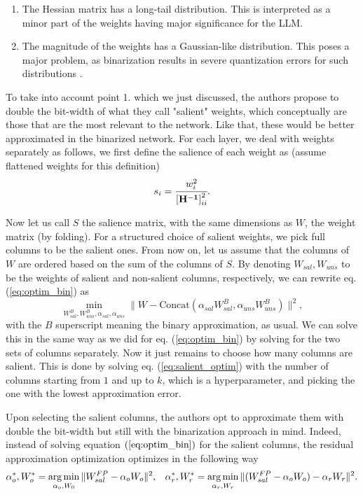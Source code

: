 \begin{enumerate}
    \item The Hessian matrix has a long-tail distribution. This is interpreted as a minor part of the weights having major significance for the LLM.
    \item The magnitude of the weights has a Gaussian-like distribution. This poses a major problem, as binarization results in severe quantization errors for such distributions \cite{jacob2017quantization}.
\end{enumerate}
   
To take into account point 1. which we just discussed, the authors propose to double the bit-width of what they call "salient" weights, which conceptually are those that are the most relevant to the network. Like that, these would be better approximated in the binarized network. For each layer, we deal with weights separately as follows, we first define the salience of each weight as (assume flattened weights for this definition)
\begin{equation}
s_i = \cfrac{w_i^2}{\mathbf{[H^{-1}]}^2_{ii}}.
\end{equation}

Now let us call $S$ the salience matrix, with the same dimensions as $W$, the weight matrix (by folding). For a structured choice of salient weights, we pick full columns to be the salient ones. From now on, let us assume that the columns of $W$ are ordered based on the sum of the columns of $S$. By denoting $W_{sal}, W_{uns}$ to be the weights of salient and non-salient columns, respectively, we can rewrite eq. (\ref{eq:optim_bin}) as
\begin{equation}
\label{eq:salient_optim}
    \min_{W_{sal}^B, W_{uns}^B, \alpha_{sal}, \alpha_{uns}} \|W - \text{Concat}(\alpha_{sal} W_{sal}^B, \alpha_{uns}W_{uns}^B) \|^2,
\end{equation}
with the $B$ superscript meaning the binary approximation, as usual. We can solve this in the same way as we did for eq. (\ref{eq:optim_bin}) by solving for the two sets of columns separately. Now it just remains to choose how many columns are salient. This is done by solving eq. (\ref{eq:salient_optim}) with the number of columns starting from $1$ and up to $k$, which is a hyperparameter, and picking the one with the lowest approximation error.

Upon selecting the salient columns, the authors opt to approximate them with double the bit-width but still with the binarization approach in mind. Indeed, instead of solving equation $(\ref{eq:optim_bin})$ for the salient columns, the residual approximation optimization optimizes in the following way
\begin{equation}
    \alpha_o^*, W_o^* = \operatorname*{arg\,min}_{\alpha_o, W_0} \|W_{sal}^{FP} - \alpha_o W_o\|^2, \;\;\;  \alpha_r^*, W_r^* = \operatorname*{arg\,min}_{\alpha_r, W_r} \|(W_{sal}^{FP} - \alpha_o W_o) - \alpha_r W_r\|^2.
\end{equation}

